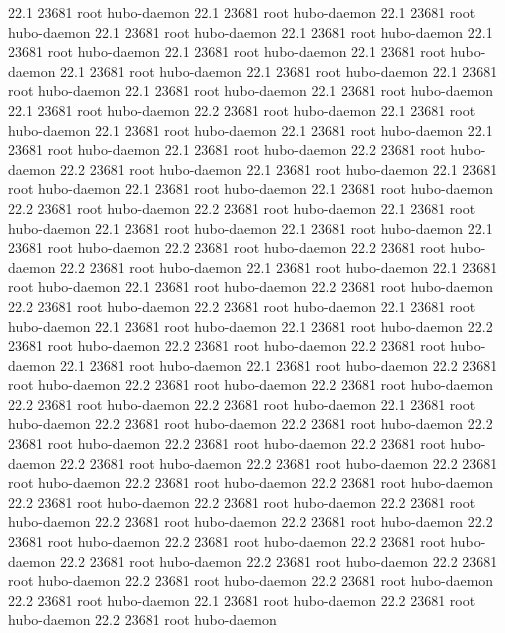 22.1 23681 root     hubo-daemon
22.1 23681 root     hubo-daemon
22.1 23681 root     hubo-daemon
22.1 23681 root     hubo-daemon
22.1 23681 root     hubo-daemon
22.1 23681 root     hubo-daemon
22.1 23681 root     hubo-daemon
22.1 23681 root     hubo-daemon
22.1 23681 root     hubo-daemon
22.1 23681 root     hubo-daemon
22.1 23681 root     hubo-daemon
22.1 23681 root     hubo-daemon
22.1 23681 root     hubo-daemon
22.1 23681 root     hubo-daemon
22.2 23681 root     hubo-daemon
22.1 23681 root     hubo-daemon
22.1 23681 root     hubo-daemon
22.1 23681 root     hubo-daemon
22.1 23681 root     hubo-daemon
22.1 23681 root     hubo-daemon
22.2 23681 root     hubo-daemon
22.2 23681 root     hubo-daemon
22.1 23681 root     hubo-daemon
22.1 23681 root     hubo-daemon
22.1 23681 root     hubo-daemon
22.1 23681 root     hubo-daemon
22.2 23681 root     hubo-daemon
22.2 23681 root     hubo-daemon
22.1 23681 root     hubo-daemon
22.1 23681 root     hubo-daemon
22.1 23681 root     hubo-daemon
22.1 23681 root     hubo-daemon
22.2 23681 root     hubo-daemon
22.2 23681 root     hubo-daemon
22.2 23681 root     hubo-daemon
22.1 23681 root     hubo-daemon
22.1 23681 root     hubo-daemon
22.1 23681 root     hubo-daemon
22.2 23681 root     hubo-daemon
22.2 23681 root     hubo-daemon
22.2 23681 root     hubo-daemon
22.1 23681 root     hubo-daemon
22.1 23681 root     hubo-daemon
22.1 23681 root     hubo-daemon
22.2 23681 root     hubo-daemon
22.2 23681 root     hubo-daemon
22.2 23681 root     hubo-daemon
22.1 23681 root     hubo-daemon
22.1 23681 root     hubo-daemon
22.2 23681 root     hubo-daemon
22.2 23681 root     hubo-daemon
22.2 23681 root     hubo-daemon
22.2 23681 root     hubo-daemon
22.2 23681 root     hubo-daemon
22.1 23681 root     hubo-daemon
22.2 23681 root     hubo-daemon
22.2 23681 root     hubo-daemon
22.2 23681 root     hubo-daemon
22.2 23681 root     hubo-daemon
22.2 23681 root     hubo-daemon
22.2 23681 root     hubo-daemon
22.2 23681 root     hubo-daemon
22.2 23681 root     hubo-daemon
22.2 23681 root     hubo-daemon
22.2 23681 root     hubo-daemon
22.2 23681 root     hubo-daemon
22.2 23681 root     hubo-daemon
22.2 23681 root     hubo-daemon
22.2 23681 root     hubo-daemon
22.2 23681 root     hubo-daemon
22.2 23681 root     hubo-daemon
22.2 23681 root     hubo-daemon
22.2 23681 root     hubo-daemon
22.2 23681 root     hubo-daemon
22.2 23681 root     hubo-daemon
22.2 23681 root     hubo-daemon
22.2 23681 root     hubo-daemon
22.2 23681 root     hubo-daemon
22.2 23681 root     hubo-daemon
22.1 23681 root     hubo-daemon
22.2 23681 root     hubo-daemon
22.2 23681 root     hubo-daemon
